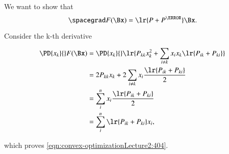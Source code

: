 {We want to show that
\begin{equation}\label{eqn:convex-optimizationLecture2:404}
\spacegrad F(\Bx) = \lr{P + P^\T } \Bx.
\end{equation}

Consider the k-th derivative

\begin{equation}\label{eqn:convex-optimizationLecture2:424}
\begin{aligned}
\PD{x_k}{} F(\Bx)
&=
\PD{x_k}{}
\lr{
P_{kk} x_k^2
+
\sum_{i \ne k} x_i x_k \lr{ P_{ik} + P_{ki} }
} \\
&=
2 P_{kk} x_k + 2
\sum_{i \ne k} x_i \frac{\lr{ P_{ik} + P_{ki} }}{2} \\
&=
\sum_{i}^n x_i \frac{\lr{ P_{ik} + P_{ki} }}{2} \\
&=
\sum_{i}^n \lr{ P_{ik} + P_{ki} } x_i
,
\end{aligned}
\end{equation}

which proves \cref{eqn:convex-optimizationLecture2:404}.
} %
